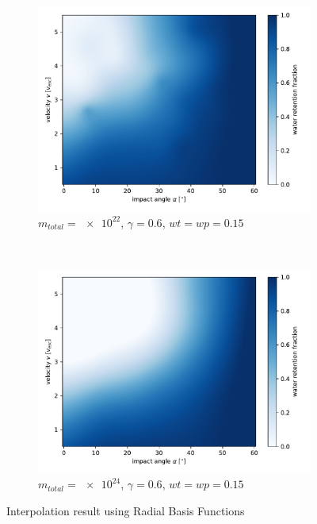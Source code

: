 \begin{figure}[h!] %
	\centering
	\begin{subfigure}[t]{0.5\textwidth}
		\centering
		\includegraphics[width=\linewidth]{images/plots/rbf1.pdf}
		\caption{$m_{total}=\num{e22}$, $\gamma=0.6$, $wt=wp=0.15$}
		\label{fig:rbf1}
	\end{subfigure}%
	~ 
	\begin{subfigure}[t]{0.5\textwidth}
		\centering
		\includegraphics[width=\linewidth]{images/plots/rbf2.pdf}
\caption{$m_{total}=\num{e24}$, $\gamma=0.6$, $wt=wp=0.15$}
		\label{fig:rbf2}
	\end{subfigure}
	\caption{Interpolation result using Radial Basis Functions}
	\label{fig:rbfresults}
\end{figure}
